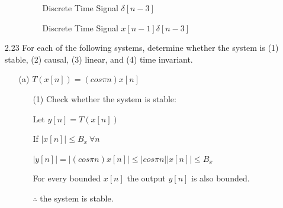 \documentclass[fleqn]{article}
\begin{document}
\begin{enumerate}[nolistsep]
\begin{enumerate}[nolistsep]
			\begin{figure}[H]
			\centerline{}
		\caption{Discrete Time Signal $\delta[n-3]$}
		\label{part_e_delta_nm3}
		\end{figure}
		
		\begin{figure}[H]
			\centerline{}
		\caption{Discrete Time Signal $x[n-1]\delta[n-3]$}
		\label{part_e}
		\end{figure}
		
		\end{enumerate}
		
		\item[2.23] For each of the following systems, determine whether the system is (1) stable, (2) causal, (3) linear, and (4) time invariant.
		
		\begin{enumerate}[nolistsep]
			\item[(a)] $T(x[n]) = (cos{\pi}n)x[n]$
			
				\begin{enumerate}[nolistsep]
				
					\item[(1)] Check whether the system is stable:
			
					Let $y[n] = T(x[n])$
			
					If $|x[n]| \leq B_x\ \forall n$
			
					$|y[n]| = |(cos{\pi}n)x[n]| \leq |cos{\pi}n||x[n]| \leq B_x$
			
					For every bounded $x[n]$ the output $y[n]$ is also bounded.
			
					$\therefore$ the system is stable.
					

\end{enumerate}
\end{enumerate}
\end{enumerate}
\end{document}
